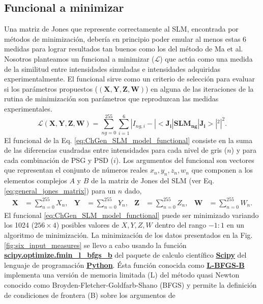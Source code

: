 \subsection{Funcional a minimizar}
Una matriz de Jones que represente correctamente al SLM, encontrada por
métodos de minimización, debería en principio poder
emular al menos estas 6 medidas para lograr resultados tan buenos como
los del método de Ma et al. Nosotros planteamos un funcional a
minimizar ($\mathcal{L}$) que actúa como una medida de la similitud entre 
intensidades simuladas e intensidades adquiridas experimentalmente. El
funcional sirve como un criterio de selección para evaluar si los
parámetros propuestos ($(\mathbf{X,Y,Z,W})$) en alguna de las iteraciones de la rutina de
minimización son parámetros que reproduzcan las medidas
experimentales.  
\begin{equation}
\mathcal{L}(\mathbf{X,Y,Z,W}) = \sum_{ng=0}^{255}\sum_{i=1}^6 | I_{ng,i} -
|<\mathbf{J_{i}}|\mathbf{SLM_{ng}}|\mathbf{J_{i}}>|^2|^2.
\label{eq:ChGen_SLM_model_functional}  
\end{equation}
El funcional de la Eq. \ref{eq:ChGen_SLM_model_functional}  consiste en
la suma de las diferencias cuadradas entre intensidades para cada
nivel de gris ($n$) y para cada combinación de PSG y PSD ($i$). Los
argumentos del funcional son vectores que representan el conjunto de números
reales $x_n, y_n, z_n, w_n$ que componen a los elementos complejos $A$ y $B$
de la matriz de Jones del SLM (ver 
Eq. \ref{eq:general_jones_matrix}) para un $n$ dado,
\begin{align*}
\mathbf{X} &= \sum_{n=0}^{255}X_n,&\mathbf{Y} &= \sum_{n=0}^{255}Y_n,&\mathbf{Z} &= \sum_{n=0}^{255}Z_n,&\mathbf{W} &= \sum_{n=0}^{255}W_n.
\end{align*} 
El funcional \ref{eq:ChGen_SLM_model_functional}  puede ser minimizado
variando los 1024 ($256\times 4$) posibles valores 
de $X,Y,Z,W$ dentro del rango $-1:1$ en un algoritmo de
minimización. La minimización de los datos presentados en la
Fig. \ref{fig:six_input_measures} se llevo a cabo usando la función
 \href{http://goo.gl/tv5Iyz}{\bf{scipy.optimize.fmin\_l\_bfgs\_b}} del
 paquete de calculo científico \href{http://goo.gl/fRhz8s}{\textbf{Scipy}} del
 lenguaje de programación \href{https://www.python.org}{\textbf{Python}}. Ésta
 función conocida como \href{http://en.wikipedia.org/wiki/Limited-memory\_BFGS}{\textbf{L-BFGS-B}} implementa una versión de memoria limitada (L) del método quasi
 Newton conocido como Broyden-Fletcher-Goldfarb-Shano (BFGS) y permite
 la definición de condiciones de frontera (B) sobre los argumentos de
